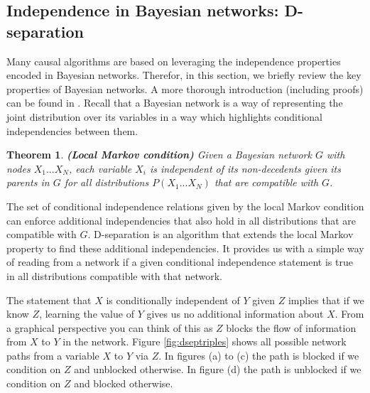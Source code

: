 \documentclass[11pt,a4paper,oneside]{book}
\theoremstyle{plain}
\newtheorem{theorem}{Theorem}
\theoremstyle{definition}
\begin{document}
\subsection{Independence in Bayesian networks: D-separation}
\label{sec:dsep}

Many causal algorithms are based on leveraging the independence properties encoded in Bayesian networks. Therefor, in this section, we briefly review the key properties of Bayesian networks. A more thorough introduction (including proofs) can be found in \citep{Koller2009}. Recall that a Bayesian network is a way of representing the joint distribution over its variables in a way which highlights conditional independencies between them. 

\vspace{.3cm}
\begin{theorem}
\textbf{(Local Markov condition)} Given a Bayesian network $G$ with nodes $X_{1}...X_{N}$, each variable $X_{i}$ is independent of its non-decedents given its parents in $G$ for all distributions $P(X_{1}...X_{N})$ that are compatible with $G$.
\end{theorem}

The set of conditional independence relations given by the local Markov condition can enforce additional independencies that also hold in all distributions that are compatible with $G$. D-separation is an algorithm that extends the local Markov property to find these additional independencies. It provides us with a simple way of reading from a network if a given conditional independence statement is true in all distributions compatible with that network.


The statement that $X$ is conditionally independent of $Y$ given $Z$ implies that if we know $Z$, learning the value of $Y$ gives us no additional information about $X$. From a graphical perspective you can think of this as $Z$ blocks the flow of information from $X$ to $Y$ in the network. Figure \ref{fig:dseptriples} shows all possible network paths from a variable $X$ to $Y$ via $Z$. In figures (a) to (c) the path is blocked if we condition on $Z$ and unblocked otherwise. In figure (d) the path is unblocked if we condition on $Z$ and blocked otherwise. 
\end{document}
